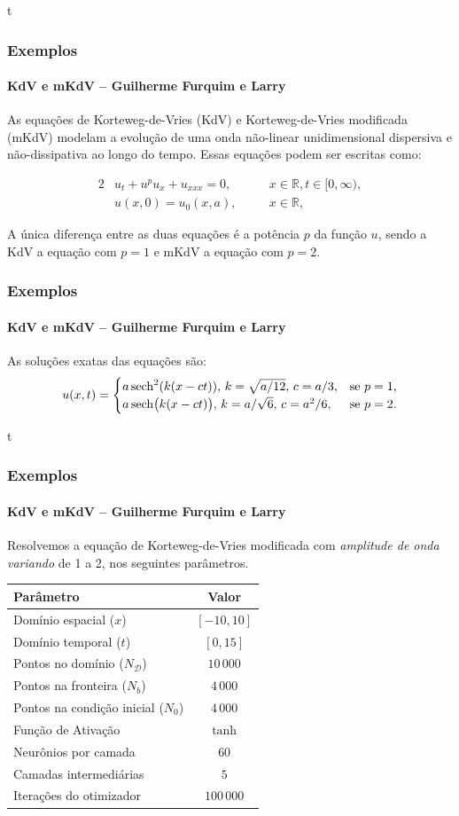 \documentclass[usenames,dvipsnames,brazil,aspectratio=169]{beamer}
\begin{document}
\begin{frame}{t}
    \frametitle{Exemplos}
    \framesubtitle{KdV e mKdV -- Guilherme Furquim e Larry}
    As equações de Korteweg-de-Vries (KdV) e Korteweg-de-Vries modificada (mKdV) modelam a evolução de uma onda não-linear unidimensional dispersiva e não-dissipativa ao longo do tempo. Essas equações podem ser escritas como:
    
    \begin{alignat*}2
        &u_t  + u^pu_x + u_{xxx} = 0,   &\quad & x  \in \mathbb{R}, t \in [0,\infty),\\ 
        &u(x,0) =   u_0(x,a), &\quad & x  \in \mathbb{R},
    \end{alignat*}

    \pause

    A única diferença entre as duas equações é a potência $p$ da função $u$, sendo a KdV a equação com $p=1$ e mKdV a equação com $p=2$.
\end{frame}

\begin{frame}
    \frametitle{Exemplos}
    \framesubtitle{KdV e mKdV -- Guilherme Furquim e Larry}
    As soluções exatas das equações são:
    \begin{equation*}
        u(x,t)=\begin{cases}
            a \sech^2(k(x-ct)), \,  k = \sqrt{a/12}, \,   c = a/3, & \text{se $p = 1$,}\\
            a \sech (k(x-ct) ), \,  k =a/\sqrt{6}, \,   c = a^2/6, & \text{se $p = 2$.}
        \end{cases}
    \end{equation*}
\end{frame}

\begin{frame}{t}
    \frametitle{Exemplos}
    \framesubtitle{KdV e mKdV -- Guilherme Furquim e Larry}
    Resolvemos a equação de Korteweg-de-Vries modificada com \textit{amplitude de onda variando} de 1 a 2, nos seguintes parâmetros.
    \begin{table}[H]
        \centering
        \begin{tabular}{|l|c|}
            \hline
            \textbf{Parâmetro} & \textbf{Valor} \\
            \hline
            Domínio espacial ($x$) & $[-10, 10]$ \\
            Domínio temporal ($t$) & $[0, 15]$ \\
            Pontos no domínio ($N_{\mathcal{D}}$) & $10\,000$ \\
            Pontos na fronteira ($N_b$) & $4\,000$ \\
            Pontos na condição inicial ($N_0$) & $4\,000$ \\
            Função de Ativação & $\tanh$ \\
            Neurônios por camada & $60$ \\
            Camadas intermediárias & $5$ \\
            Iterações do otimizador & $100\,000$ \\
            \hline
        \end{tabular}
    \end{table}
\end{frame}
\end{document}
